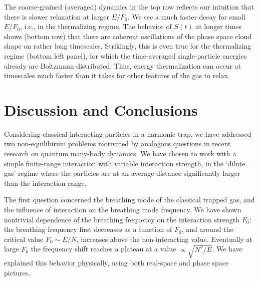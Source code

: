 \documentclass[a4paper, onecolumn]{revtex4-1}
\begin{document}
The coarse-grained (averaged) dynamics in the top row reflects our intuition that there is slower
relaxation at larger $E/F_0$.  We see a much faster decay for small $E/F_0$, i.e., in the
thermalizing regime.
%
The behavior of $S(t)$ at longer times shows (bottom row) that there are coherent oscillations of
the phase space cloud shape on rather long timescales.  Strikingly, this is even true for the
thermalizing regime (bottom left panel), for which the time-averaged single-particle energies
already are Boltzmann-distributed.  Thus, energy thermalization can occur at timescales much faster
than it takes for other features of the gas to relax.




\section{Discussion and Conclusions} \label{sec:concl} 

Considering classical interacting particles in a harmonic trap, we have addressed two
non-equilibirum problems motivated by analogous questions in recent research on quantum many-body
dynamics.  We have chosen to work with a simple finite-range interaction with variable interaction
strength, in the `dilute gas' regime where the particles are at an average distance significantly
larger than the interaction range.

The first question concerned the breathing mode of the classical trapped gas, and the influence of
interaction on the breathing mode frequency.  We have shown nontrivial dependence of the breathing
frequency on the interaction strength $F_0$: the breathing frequency first decreases as a function
of $F_0$, and around the critical value $F_0 \sim E/N$, increases above the non-interacting value.
Eventually at large $F_0$ the frequency shift reaches a plateau at a value $\propto\sqrt{N^3/E}$.
We have explained this behavior physically, using both real-space and phase space pictures.
\end{document}
